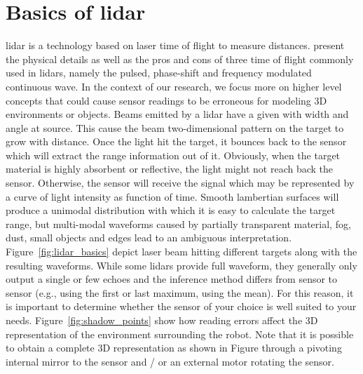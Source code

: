 \section{Basics of \gls{lidar}}
\label{sec:chap_lidar_basics}

\gls{lidar} is a technology based on laser time of flight to measure distances. \citet{lidar_basics} present the physical details as well as the pros and cons of three time of flight commonly used in \gls{lidar}s, namely the pulsed, phase-shift and frequency modulated continuous wave. In the context of our research, we focus more on higher level concepts that could cause sensor readings to be erroneous for modeling 3D environments or objects. Beams emitted by a \gls{lidar} have a given with width and angle at source. This cause the beam two-dimensional pattern on the target to grow with distance. Once the light hit the target, it bounces back to the sensor which will extract the range information out of it. Obviously, when the target material is highly absorbent or reflective, the light might not reach back the sensor. Otherwise, the sensor will receive the signal which may be represented by a curve of light intensity as function of time. Smooth lambertian surfaces will produce a unimodal distribution with which it is easy to calculate the target range, but multi-modal waveforms caused by partially transparent material, fog, dust, small objects and edges lead to an ambiguous interpretation. Figure~\ref{fig:lidar_basics} depict laser beam hitting different targets along with the resulting waveforms. While some \gls{lidar}s provide full waveform, they generally only output a single or few echoes and the inference method differs from sensor to sensor (e.g., using the first or last maximum, using the mean). For this reason, it is important to determine whether the sensor of your choice is well suited to your needs. Figure~\ref{fig:shadow_points} show how reading errors affect the 3D representation of the environment surrounding the robot.  Note that it is possible to obtain a complete 3D representation as shown in Figure through a pivoting internal mirror to the sensor and / or an external motor rotating the sensor.

